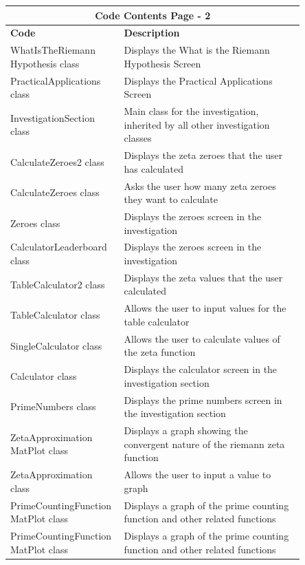 \documentclass[12pt]{article}
\begin{document}
\begin{table}[ht]
    \centering
    \begin{tabular}{|p{0.26\linewidth}|p{0.59\linewidth}|}
    \hline
    \multicolumn{2}{|c|}{\textbf{Code Contents Page - 2}}\\
    \hline
    \hline
    \textbf{Code} & \textbf{Description}\\
    \hline
    WhatIsTheRiemann \text{ }  \text{ } Hypothesis class & Displays the What is the Riemann Hypothesis Screen\\
    \hline
    PracticalApplications class & Displays the Practical Applications Screen\\
    \hline
    InvestigationSection class & Main class for the investigation, inherited by all other investigation classes\\
    \hline
    CalculateZeroes2 class & Displays the zeta zeroes that the user has calculated\\
    \hline
    CalculateZeroes class & Asks the user how many zeta zeroes they want to calculate\\
    \hline
    Zeroes class & Displays the zeroes screen in the investigation\\
    \hline
    CalculatorLeaderboard class & Displays the zeroes screen in the investigation\\
    \hline
    TableCalculator2 class & Displays the zeta values that the user calculated\\
    \hline
    TableCalculator class & Allows the user to input values for the table calculator\\
    \hline
    SingleCalculator class & Allows the user to calculate values of the zeta function\\
    \hline
    Calculator class & Displays the calculator screen in the investigation section\\
    \hline
    PrimeNumbers class & Displays the prime numbers screen in the investigation section\\
    \hline
    ZetaApproximation \text{ } \text{ } MatPlot class & Displays a graph showing the convergent  nature of the riemann zeta function\\
    \hline
    ZetaApproximation class & Allows the user to input a value to graph\\
    \hline
    PrimeCountingFunction MatPlot class & Displays a graph of the prime counting function and other related functions\\
    \hline
    PrimeCountingFunction MatPlot class & Displays a graph of the prime counting function and other related functions\\

\end{tabular}
\end{table}
\end{document}
